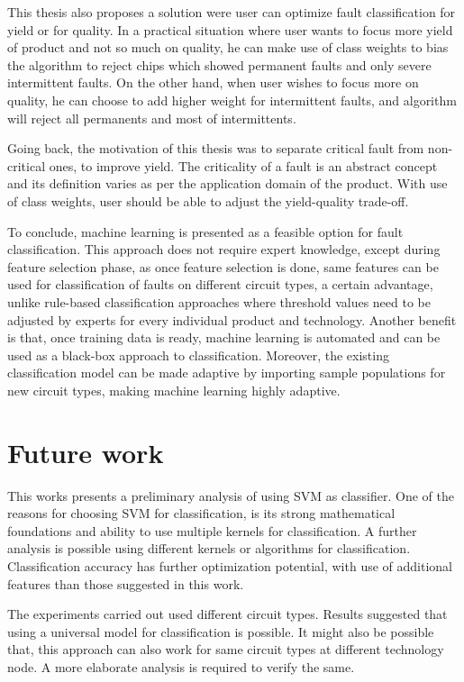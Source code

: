 This thesis also proposes a solution were user can optimize fault classification for yield or for quality. In a practical situation where user wants to focus more yield of product and not so much on quality, he can make use of class weights to bias the algorithm to reject chips which showed permanent faults and only severe intermittent faults. On the other hand, when user wishes to focus more on quality, he can choose to add higher weight for intermittent faults, and algorithm will reject all permanents and most of intermittents.

Going back, the motivation of this thesis was to separate critical fault from non-critical ones, to improve yield. The criticality of a fault is an abstract concept and its definition varies as per the application domain of the product. With use of class weights, user should be able to adjust the yield-quality trade-off.

To conclude, machine learning is presented as a feasible option for fault classification. This approach does not require expert knowledge, except during feature selection phase, as once feature selection is done, same features can be used for classification of faults on different circuit types, a certain advantage, unlike rule-based classification approaches where threshold values need to be adjusted by experts for every individual product and technology. Another benefit is that, once training data is ready, machine learning is automated and can be used as a black-box approach to classification. Moreover, the existing classification model can be made adaptive by importing sample populations for new circuit types, making machine learning highly adaptive. 

\section{Future work}

This works presents a preliminary analysis of using SVM as classifier. One of the reasons for choosing SVM for classification, is its strong mathematical foundations \cite{Vapnik1995, Ben-Hur2010} and ability to use multiple kernels for classification. A further analysis is possible using different kernels or algorithms for classification. Classification accuracy has further optimization potential, with use of additional features than those suggested in this work.

The experiments carried out used different circuit types. Results suggested that using a universal model for classification is possible. It might also be possible that, this approach can also work for same circuit types at different technology node. A more elaborate analysis is required to verify the same.

